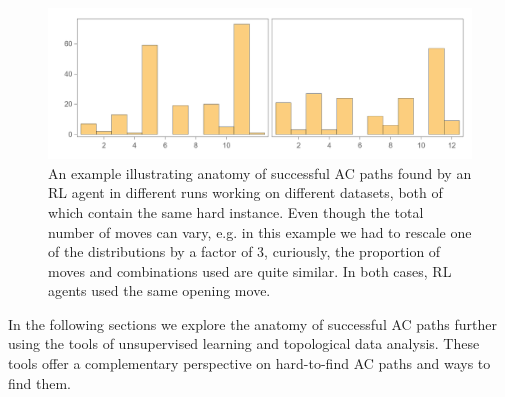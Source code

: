 \begin{figure}[h]
	\centering
	\includegraphics[scale=0.55]{fig/anatomy200.png}
	\caption{An example illustrating anatomy of successful AC paths found by an RL agent in different runs working on different datasets, both of which contain the same hard instance. Even though the total number of moves can vary, e.g. in this example we had to rescale one of the distributions by a factor of 3, curiously, the proportion of moves and combinations used are quite similar. In both cases, RL agents used the same opening move.}
	\label{fig:anatomy200}
\end{figure}

In the following sections we explore the anatomy of successful AC paths further using the tools of unsupervised learning and topological data analysis. These tools offer a complementary perspective on hard-to-find AC paths and ways to find them.
